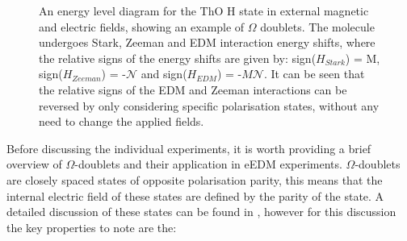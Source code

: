 \begin{figure}[h]
{{
        }
    }
    \caption{An energy level diagram for the ThO H state in external magnetic and electric fields, showing an example of $\Omega$ doublets. The molecule undergoes Stark, Zeeman and EDM interaction energy shifts, where the relative signs of the energy shifts are given by: sign($H_{Stark}$) = M, sign($H_{Zeeman}$) = -$\mathcal{N}$ and sign($H_{EDM}$) = -$M \mathcal{N}$. It can be seen that the relative signs of the EDM and Zeeman interactions can be reversed by only considering specific polarisation states, without any need to change the applied fields.}
    \label{fig:ThO_energy_levels}
\end{figure}

Before discussing the individual experiments, it is worth providing a brief overview of $\Omega$-doublets and their application in eEDM experiments. $\Omega$-doublets are closely spaced states of opposite polarisation parity, this means that the internal electric field of these states are defined by the parity of the state. A detailed discussion of these states can be found in \cite{Vutha_2010}, however for this discussion the key properties to note are the:

